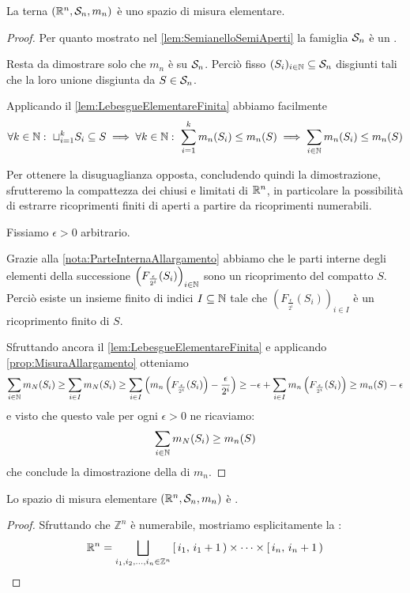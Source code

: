 \begin{theorem}\label{LebesguePremisura}
	La terna $(\R^n,\S_n,m_n)$ è uno spazio di misura elementare.
\end{theorem}
\begin{proof}
	Per quanto mostrato nel \cref{lem:SemianelloSemiAperti} la famiglia $\S_n$ è un \semiring{}.
	
	Resta da dimostrare solo che $m_n$ è \sigadd{} su $\S_n$.
	Perciò fisso $(S_i)_{i\in\N}\subseteq \S_n$ disgiunti tali che la loro unione disgiunta da $S\in\S_n$.
	
	Applicando il \cref{lem:LebesgueElementareFinita} abbiamo facilmente
	\begin{equation*}
		\forall k\in\N:\ \sqcup_{i=1}^k S_i\subseteq S\implies \forall k\in\N:\ \sum_{i=1}^k m_n(S_i)\le m_n(S) \implies \sum_{i\in\N}m_n(S_i)\le m_n(S)
	\end{equation*}

	
	Per ottenere la disuguaglianza opposta, concludendo quindi la dimostrazione, sfrutteremo la compattezza dei chiusi e limitati di $\R^n$, in particolare la possibilità di estrarre ricoprimenti finiti di aperti a partire da ricoprimenti numerabili.
	
	Fissiamo $\epsilon>0$ arbitrario.
	
	Grazie alla \cref{nota:ParteInternaAllargamento} abbiamo che le parti interne degli elementi della successione $\left(F_{\frac\epsilon{2^i}}(S_i)\right)_{i\in\N}$ sono un ricoprimento del compatto $S$.
	Perciò esiste un insieme finito di indici $I\subseteq \N$ tale che $\left(F_{\frac\epsilon{2^i}}(S_i)\right)_{i\in I}$ è un ricoprimento finito di $S$.
	
	Sfruttando ancora il \cref{lem:LebesgueElementareFinita} e applicando \cref{prop:MisuraAllargamento} otteniamo
	\begin{equation*}
		\sum_{i\in\N}m_N(S_i)\ge \sum_{i\in I}m_N(S_i)\ge \sum_{i\in I}\left(m_n\left(F_{\frac\epsilon{2^i}}(S_i)\right)-\frac\epsilon{2^i}\right)
		\ge -\epsilon+\sum_{i\in I}m_n\left(F_{\frac\epsilon{2^i}}(S_i)\right)\ge m_n(S)-\epsilon
	\end{equation*}
	e visto che questo vale per ogni $\epsilon>0$ ne ricaviamo:
	\begin{equation*}
		\sum_{i\in\N}m_N(S_i)\ge m_n(S)
	\end{equation*}
	che conclude la dimostrazione della \sigadd[ità] di $m_n$.
\end{proof}

\begin{proposition}\label{prop:LebesguePremisuraSigFin}
	Lo spazio di misura elementare $(\R^n,\S_n,m_n)$ è \sigfin[o].
\end{proposition}
\begin{proof}
	Sfruttando che $\mathbb Z^n$ è numerabile, mostriamo esplicitamente la \sigfin[ezza]:
	\begin{equation*}
		\R^n=\bigsqcup_{i_1,i_2,\dots,i_n\in\mathbb Z^n} \co{i_1}{i_1+1}\times\cdots \times\co{i_n}{i_n+1}
	\end{equation*}
	
\end{proof}

